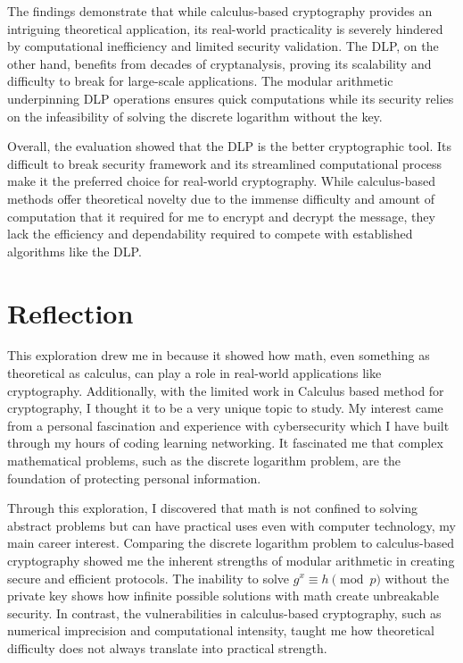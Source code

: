 \documentclass[12pt]{article}
\begin{document}
The findings demonstrate that while calculus-based cryptography provides an intriguing theoretical application, its real-world practicality is severely hindered by computational inefficiency and limited security validation. The DLP, on the other hand, benefits from decades of cryptanalysis, proving its scalability and difficulty to break for large-scale applications. The modular arithmetic underpinning DLP operations ensures quick computations while its security relies on the infeasibility of solving the discrete logarithm without the key.

Overall, the evaluation showed that the DLP is the better cryptographic tool. Its difficult to break security framework and its streamlined computational process make it the preferred choice for real-world cryptography. While calculus-based methods offer theoretical novelty due to the immense difficulty and amount of computation that it required for me to encrypt and decrypt the message, they lack the efficiency and dependability required to compete with established algorithms like the DLP.



\section*{Reflection}

This exploration drew me in because it showed how math, even something as theoretical as calculus, can play a role in real-world applications like cryptography. Additionally, with the limited work in Calculus based method for cryptography, I thought it to be a very unique topic to study. My interest came from a personal fascination and experience with cybersecurity which I have built through my hours of coding learning networking. It fascinated me that complex mathematical problems, such as the discrete logarithm problem, are the foundation of protecting personal information.

Through this exploration, I discovered that math is not confined to solving abstract problems but can have practical uses even with computer technology, my main career interest. Comparing the discrete logarithm problem to calculus-based cryptography showed me the inherent strengths of modular arithmetic in creating secure and efficient protocols. The inability to solve \( g^x \equiv h \pmod{p} \) without the private key shows how infinite possible solutions with math create unbreakable security. In contrast, the vulnerabilities in calculus-based cryptography, such as numerical imprecision and computational intensity, taught me how theoretical difficulty does not always translate into practical strength.
\end{document}
